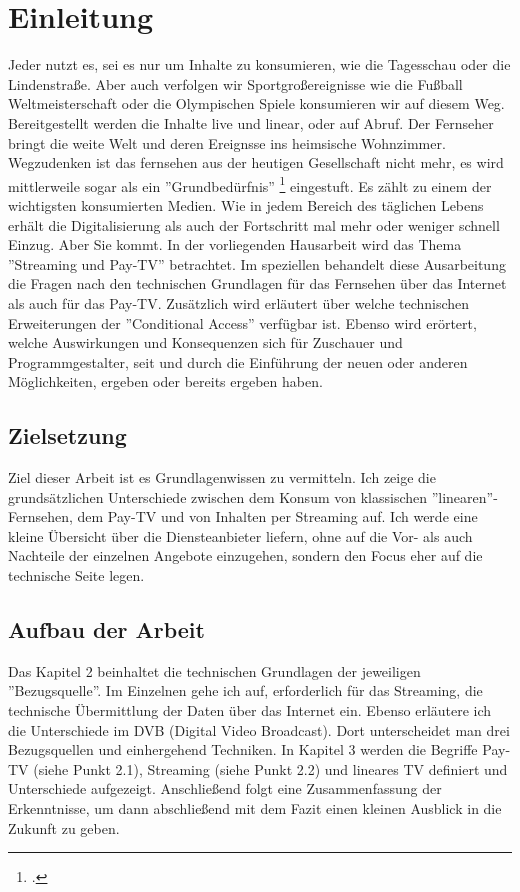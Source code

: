 \section{Einleitung}
Jeder nutzt es, sei es nur um Inhalte zu konsumieren, wie die Tagesschau oder die Lindenstraße. Aber auch verfolgen wir Sportgroßereignisse wie die Fußball Weltmeisterschaft oder die Olympischen Spiele konsumieren wir auf diesem Weg.
Bereitgestellt werden die Inhalte live und linear, oder auf Abruf. \newline
Der Fernseher bringt die weite Welt und deren Ereignsse ins heimsische Wohnzimmer.
Wegzudenken ist das fernsehen aus der heutigen Gesellschaft nicht mehr, es wird mittlerweile sogar als ein ''Grundbedürfnis'' \footcite[Vgl. ][Sozialgericht Frankfurt, Urteil vom 28. Mai 2009 - S 17 AS 388/06]{sg.TV} eingestuft.
Es zählt zu einem der wichtigsten konsumierten Medien.
Wie in jedem Bereich des täglichen Lebens erhält die Digitalisierung als auch der Fortschritt mal mehr oder weniger schnell Einzug. Aber Sie kommt. In der vorliegenden Hausarbeit wird das Thema
''Streaming und Pay-TV'' betrachtet. \newline
Im speziellen behandelt diese Ausarbeitung die Fragen nach den technischen Grundlagen für das Fernsehen über das Internet als auch für das Pay-TV.
Zusätzlich wird erläutert über welche technischen Erweiterungen der ''Conditional Access'' verfügbar ist.
Ebenso wird erörtert, welche Auswirkungen und Konsequenzen sich für Zuschauer und Programmgestalter, seit und durch die Einführung der neuen oder anderen Möglichkeiten, ergeben oder bereits ergeben haben.

\subsection{Zielsetzung}
Ziel dieser Arbeit ist es Grundlagenwissen zu vermitteln. Ich zeige die grundsätzlichen Unterschiede zwischen dem Konsum von klassischen ''linearen''-Fernsehen, dem Pay-TV und von Inhalten per Streaming auf.
Ich werde eine kleine Übersicht über die Diensteanbieter liefern, ohne auf die Vor- als auch Nachteile der einzelnen Angebote einzugehen, sondern den Focus eher auf die technische Seite legen.


\subsection{Aufbau der Arbeit}
Das Kapitel 2 beinhaltet die technischen Grundlagen der jeweiligen ''Bezugsquelle''. Im Einzelnen gehe ich auf, erforderlich für das Streaming, die technische Übermittlung der Daten über das Internet ein.
Ebenso erläutere ich die Unterschiede im DVB (Digital Video Broadcast). Dort unterscheidet man drei Bezugsquellen und einhergehend Techniken.
In Kapitel 3 werden die Begriffe Pay-TV (siehe Punkt 2.1), Streaming (siehe Punkt 2.2) und lineares TV definiert und Unterschiede aufgezeigt.
Anschließend folgt eine Zusammenfassung der Erkenntnisse, um dann abschließend mit dem Fazit einen kleinen Ausblick in die Zukunft zu geben.







